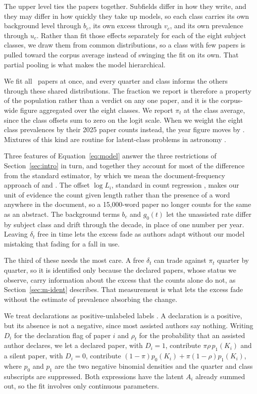 \documentclass[twocolumn]{aastex631}
\begin{document}
The upper level ties the papers together. Subfields differ in how they write, and they may differ in how quickly they take up models, so each class carries its own background level through $b_c$, its own excess through $v_c$, and its own prevalence through $u_c$. Rather than fit those effects separately for each of the eight subject classes, we draw them from common distributions, so a class with few papers is pulled toward the corpus average instead of swinging the fit on its own. That partial pooling is what makes the model hierarchical.

 We fit all \nFulltext\ papers at once, and every quarter and class informs the others through these shared distributions. The fraction we report is therefore a property of the population rather than a verdict on any one paper, and it is the corpus-wide figure aggregated over the eight classes. We report $\pi_t$ at the class average, since the class offsets sum to zero on the logit scale. When we weight the eight class prevalences by their 2025 paper counts instead, the year figure moves by \piWeightShift. Mixtures of this kind are routine for latent-class problems in astronomy \citep[e.g.,][]{Hogg2010, Foreman-Mackey2014}.

Three features of Equation~\ref{eq:model} answer the three restrictions of Section~\ref{sec:intro} in turn, and together they account for most of the difference from the standard estimator, by which we mean the document-frequency approach of \citet{Kobak2024} and \citet{Holzwarth2026}. The offset $\log L_i$, standard in count regression \citep{Cameron2013}, makes our unit of evidence the count given length rather than the presence of a word anywhere in the document, so a 15{,}000-word paper no longer counts for the same as an abstract. The background terms $b_c$ and $g_0(t)$ let the unassisted rate differ by subject class and drift through the decade, in place of one number per year. Leaving $\delta_t$ free in time lets the excess fade as authors adapt without our model mistaking that fading for a fall in use.

The third of these needs the most care. A free $\delta_t$ can trade against $\pi_t$ quarter by quarter, so it is identified only because the declared papers, whose status we observe, carry information about the excess that the counts alone do not, as Section~\ref{sec:m-ident} describes. That measurement is what lets the excess fade without the estimate of prevalence absorbing the change.

We treat declarations as positive-unlabeled labels \citep{Elkan2008}. A declaration is a positive, but its absence is not a negative, since most assisted authors say nothing. Writing $D_i$ for the declaration flag of paper $i$ and $\rho_t$ for the probability that an assisted author declares, we let a declared paper, with $D_i{=}1$, contribute $\pi\rho\,p_1(K_i)$ and a silent paper, with $D_i{=}0$, contribute $(1-\pi)p_0(K_i)+\pi(1-\rho)p_1(K_i)$, where $p_0$ and $p_1$ are the two negative binomial densities and the quarter and class subscripts are suppressed. Both expressions have the latent $A_i$ already summed out, so the fit involves only continuous parameters.
\end{document}
